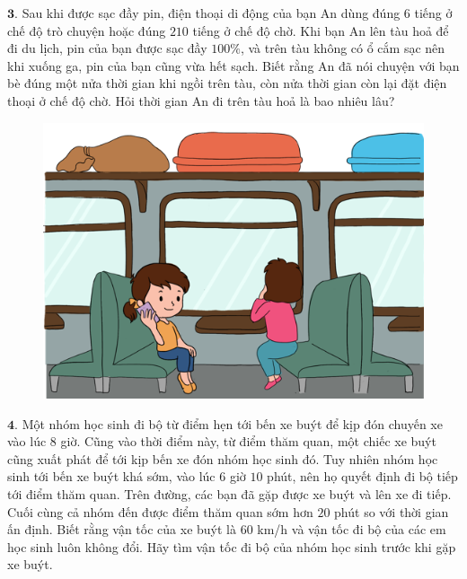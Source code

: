 \begin{multicols}{2}
\begin{figure}[H]
			\vspace*{-15pt}
		\end{figure}
	$\pmb{3.}$ Sau khi được sạc đầy pin, điện thoại di động của bạn An dùng đúng $6$ tiếng ở chế độ trò chuyện hoặc đúng $210$ tiếng ở chế độ chờ. Khi bạn An lên tàu hoả để đi du lịch, pin của bạn được sạc đầy $100\%$, và trên tàu không có ổ cắm sạc nên khi xuống ga, pin của bạn cũng vừa hết sạch. Biết rằng An đã nói chuyện với bạn bè đúng một nửa thời gian khi ngồi trên tàu, còn nửa thời gian còn lại đặt điện thoại ở chế độ chờ. Hỏi thời gian An đi trên tàu hoả là bao nhiêu lâu?
	\begin{figure}[H]
			\centering
			\vspace*{-5pt}
			\captionsetup{labelformat= empty, justification=centering}
			\includegraphics[width=1\linewidth]{Pi5_bai3}
			\vspace*{-15pt}
		\end{figure}
	$\pmb{4.}$ Một nhóm học sinh đi bộ từ điểm hẹn tới bến xe buýt để kịp đón chuyến xe vào lúc $8$ giờ. Cũng vào thời điểm này, từ điểm thăm quan, một chiếc xe buýt cũng xuất phát để tới kịp bến xe đón nhóm học sinh đó. Tuy  nhiên nhóm học sinh tới bến xe buýt khá sớm, vào lúc $6$ giờ $10$ phút, nên họ quyết định đi bộ tiếp tới điểm thăm quan. Trên đường, các bạn đã gặp được xe buýt và lên xe đi tiếp.  Cuối cùng cả nhóm đến được điểm thăm quan sớm hơn $20$ phút so với thời gian ấn định. Biết rằng vận tốc của xe buýt là $60$ km/h và vận tốc đi bộ của các em học sinh luôn không đổi. Hãy tìm vận tốc đi bộ của nhóm học sinh trước khi gặp xe buýt.
	\begin{figure}[H]
			\centering
			\vspace*{-5pt}

\end{figure}
\end{multicols}
